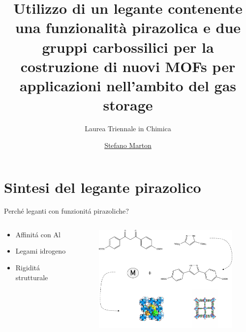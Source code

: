 \documentclass{beamer}
\title{\large{Utilizzo di un legante contenente una funzionalità pirazolica e due gruppi carbossilici per la costruzione di nuovi MOFs per applicazioni nell’ambito del gas storage}}
\subtitle{Laurea Triennale in Chimica}
\author{\href{stefano.marton@studenti.unimi.it}{Stefano Marton}}
\begin{document}
\maketitle

\section{Sintesi del legante pirazolico}

\setlength{\columnsep}{0.2cm}
\begin{frame}{Perché leganti con funzionitá pirazoliche?}
	\begin{columns}
		\hspace{1cm}
		\begin{column}{0.3\textwidth}
			\begin{itemize}
				\item Affinitá con Al
				\item Legami idrogeno
				\item Rigiditá strutturale
			\end{itemize}
		\end{column}
		\hspace{-1cm}
		\begin{column}{0.7\textwidth}
			\begin{figure}[h]
				\includegraphics[width=8cm,keepaspectratio]{illustration/drawing2.pdf}
			\end{figure}
		\end{column}
	\end{columns}
\end{frame}
\end{document}
